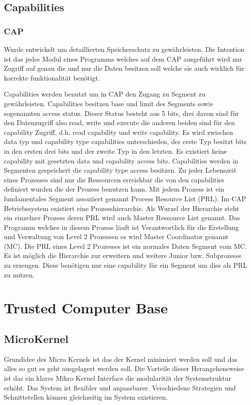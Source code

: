 \documentclass[9pt,technote]{IEEEtran}
\begin{document}
    \subsection{Capabilities}
      
      \subsubsection{CAP}
		     Wurde entwickelt um detaillierten Speicherschutz zu gew\"ahrleisten. Die Intention ist das jedes Modul eines Programms welches auf dem CAP ausgef\"uhrt wird
		     nur Zugriff auf genau die und nur die Daten besitzen soll welche sie auch wirklich f\"ur korrekte funktionalit\"at ben\"otigt.
		     
		     
		     Capabilities werden benutzt um in CAP den Zugang zu Segment zu gew\"ahrleisten.
		     Capabilities besitzen base und limit des Segments sowie sogenannten access status. Dieser Status
		     besteht aus 5 bits, drei davon sind f\"ur den Datenzugriff also read, write und execute die anderen beiden sind f\"ur den capability Zugriff,
		     d.h. read capability und write capability. Es wird zwischen data typ und capability type capabilities unterschieden,
		     der erste Typ besitzt bits in den ersten drei bits und
		     der zweite Typ in den letzten. Es existiert keine capability mit gesetzten data und capability access bits. Capabilities werden in Segmenten gespeichert die
		     capability type access besitzen. Zu jeder Lebenszeit eines Prozesses sind nur die Ressourcen erreichbar die von den
		     capabilities definiert wurden die der Prozess
		     benutzen kann. Mit jedem Prozess ist ein fundamentales Segment assoziiert genannt Process Resource List (PRL). 
		     Im CAP Betriebssystem existiert eine Prozesshierarchie.
		     Als Wurzel der Hierarchie steht ein einzelner Prozess deren PRL wird auch Master Ressource List genannt.    
		     Das Programm welches in diesem Prozess l\"auft ist Verantwortlich f\"ur die Erstellung und Verwaltung von Level 2 
		     Prozessen es wird Master Coordinator genannt (MC).
		     Die PRL eines Level 2 Prozesses ist ein normales Daten Segment vom MC. Es ist m\"oglich die Hierarchie zur erweitern und weitere Junior
		     bzw. Subprozesse zu erzeugen.
         Diese ben\"otigen nur eine capability f\"ur ein Segment um dies als PRL zu nutzen.
  \section{Trusted Computer Base}
    \subsection{MicroKernel}
	    Grundidee des Micro Kernels ist das der Kernel minimiert werden soll und das alles so gut es geht ausgelagert werden soll.
	    Die Vorteile dieser Herangehensweise ist das ein klares Mikro Kernel Interface die modularit\"at der Systemstruktur erh\"oht.
	    Das System ist flexibler und anpassbarer. Verschiedene Strategien und Schnittstellen k\"onnen gleichzeitig im System existieren.
	    
\end{document}
